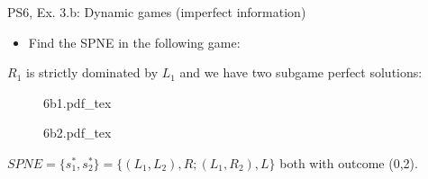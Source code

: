 \begin{frame}{PS6, Ex. 3.b: Dynamic games (imperfect information)}
    \begin{itemize}
      \item[(b)] Find the SPNE in the following game:
    \end{itemize}
    $R_1$ is strictly dominated by $L_1$ and we have two subgame perfect solutions:
    \begin{multicols}{2}
      \begin{figure}[!h]
        \center
        \def\svgwidth{\columnwidth}
        {6b1.pdf_tex}
      \end{figure}
      \vfill\null\columnbreak
      \begin{figure}[!h]
        \center
        \def\svgwidth{\columnwidth}
        {6b2.pdf_tex}
      \end{figure}
    \end{multicols}
    \vspace{-8pt}
    $SPNE=\{s_1^{*},s_2^{*}\}=\{(L_1,L_2),R;(L_1,R_2),L\}$ both with outcome (0,2).
    \vfill\null
\end{frame}

